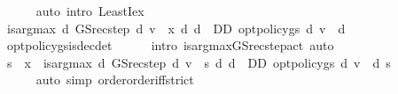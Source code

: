 \begin{isabellebody}
\ \ \ \ \isamarkupfalse%
\ {\isacharparenleft}{\kern0pt}auto\ intro{\isacharcolon}{\kern0pt}\ LeastI{\isacharunderscore}{\kern0pt}ex{\isacharparenright}{\kern0pt}\isanewline
\ \ \isamarkupfalse%
\ {\isachardoublequoteopen}is{\isacharunderscore}{\kern0pt}arg{\isacharunderscore}{\kern0pt}max\ {\isacharparenleft}{\kern0pt}{\isasymlambda}d{\isachardot}{\kern0pt}\ GS{\isacharunderscore}{\kern0pt}rec{\isacharunderscore}{\kern0pt}step\ d\ v\ {\isachardollar}{\kern0pt}\ x{\isacharparenright}{\kern0pt}\ {\isacharparenleft}{\kern0pt}{\isasymlambda}d{\isachardot}{\kern0pt}\ d\ {\isasymin}\ D\isactrlsub D{\isacharparenright}{\kern0pt}\ {\isacharparenleft}{\kern0pt}opt{\isacharunderscore}{\kern0pt}policy{\isacharunderscore}{\kern0pt}gs{\isacharprime}{\kern0pt}\ d\ v{\isacharparenright}{\kern0pt}{\isachardoublequoteclose}\ \ d\isanewline
\ \ \ \ \isamarkupfalse%
\ opt{\isacharunderscore}{\kern0pt}policy{\isacharunderscore}{\kern0pt}gs{\isacharprime}{\kern0pt}{\isacharunderscore}{\kern0pt}is{\isacharunderscore}{\kern0pt}dec{\isacharunderscore}{\kern0pt}det\isanewline
\ \ \ \ \isamarkupfalse%
\ {\isacharparenleft}{\kern0pt}intro\ is{\isacharunderscore}{\kern0pt}arg{\isacharunderscore}{\kern0pt}max{\isacharunderscore}{\kern0pt}GS{\isacharunderscore}{\kern0pt}rec{\isacharunderscore}{\kern0pt}step{\isacharunderscore}{\kern0pt}act{\isacharprime}{\kern0pt}{\isacharparenright}{\kern0pt}\ auto\isanewline
\ \ \isamarkupfalse%
\ {\isachardoublequoteopen}s\ {\isasymle}\ x\ {\isasymLongrightarrow}\ is{\isacharunderscore}{\kern0pt}arg{\isacharunderscore}{\kern0pt}max\ {\isacharparenleft}{\kern0pt}{\isasymlambda}d{\isachardot}{\kern0pt}\ GS{\isacharunderscore}{\kern0pt}rec{\isacharunderscore}{\kern0pt}step\ d\ v\ {\isachardollar}{\kern0pt}\ s{\isacharparenright}{\kern0pt}\ {\isacharparenleft}{\kern0pt}{\isasymlambda}d{\isachardot}{\kern0pt}\ d\ {\isasymin}\ D\isactrlsub D{\isacharparenright}{\kern0pt}\ {\isacharparenleft}{\kern0pt}opt{\isacharunderscore}{\kern0pt}policy{\isacharunderscore}{\kern0pt}gs{\isacharprime}{\kern0pt}\ d\ v{\isacharparenright}{\kern0pt}{\isachardoublequoteclose}\ \ d\ s\isanewline
\ \ \ \ \isamarkupfalse%
\ {\isacharasterisk}{\kern0pt}\isanewline
\ \ \ \ \isamarkupfalse%
\ {\isacharparenleft}{\kern0pt}auto\ simp{\isacharcolon}{\kern0pt}\ order{\isachardot}{\kern0pt}order{\isacharunderscore}{\kern0pt}iff{\isacharunderscore}{\kern0pt}strict{\isacharparenright}{\kern0pt}\isanewline
\ \ \isamarkupfalse%

\end{isabellebody}
